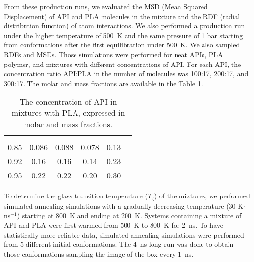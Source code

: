 From these production runs, we evaluated the MSD (Mean Squared Displacement) of API and PLA molecules in the mixture and the RDF (radial distribution function) of atom interactions. We also performed a production run under the higher temperature of 500~K and the same pressure of 1 bar starting from conformations after the first equilibration under 500~K. We also sampled RDFs and MSDs. Those simulations were performed for neat APIs, PLA polymer, and mixtures with different concentrations of API. For each API, the concentration ratio API:PLA in the number of molecules was 100:17, 200:17, and 300:17. The molar and mass fractions are available in the Table \ref{tab:fractions}.

\begin{table}[h]
	\centering
	\caption{The concentration of API in mixtures with PLA, expressed in molar and mass fractions.}
	\begin{tabular}{cccccc}
		\toprule
		{\textbf{\boldmath{$x_{\text{API}}$}}} & {\textbf{\boldmath{$w_{\text{nap}}$}}} & {\textbf{\boldmath{$w_{\text{cbz}}$}}} & {\textbf{\boldmath{$w_{\text{ibu}}$}}} & {\textbf{\boldmath{$w_{\text{indo}}$}}} \\
		\midrule
		0.85 & 0.086 & 0.088 & 0.078 & 0.13 \\
		0.92 & 0.16 & 0.16 & 0.14 & 0.23 \\
		0.95 & 0.22 & 0.22 & 0.20 & 0.30 \\
		\bottomrule
	\end{tabular}
	\label{tab:fractions}
\end{table} 

To determine the glass transition temperature ($T_\mathrm{g}$) of the mixtures, we performed simulated annealing simulations with a gradually decreasing temperature (30 K$\cdot$ ns$^{-1}$) starting at 800~K and ending at 200~K. Systems containing a mixture of API and PLA were first warmed from 500~K to 800~K for 2~ns. To have statistically more reliable data, simulated annealing simulations were performed from 5 different initial conformations. The 4~ns long run was done to obtain those conformations sampling the image of the box every 1~ns.  
